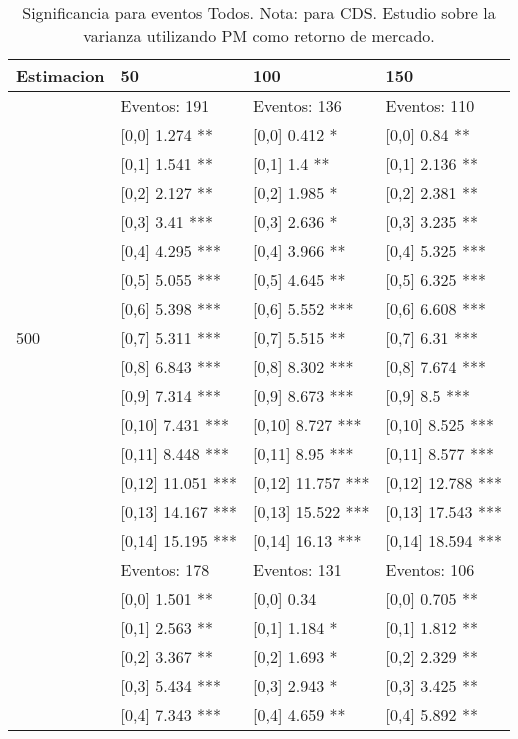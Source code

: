 \begin{table}

\caption{Significancia para eventos Todos. Nota: para CDS. Estudio sobre la varianza utilizando PM como retorno de mercado.}
\centering
\begin{tabular}[t]{llll}
\toprule
Estimacion & 50 & 100 & 150\\
\midrule
 & Eventos:  191 & Eventos:  136 & Eventos:  110\\
 & {}[0,0] 1.274 ** & {}[0,0] 0.412 * & {}[0,0] 0.84 **\\
 & {}[0,1] 1.541 ** & {}[0,1] 1.4 ** & {}[0,1] 2.136 **\\
 & {}[0,2] 2.127 ** & {}[0,2] 1.985 * & {}[0,2] 2.381 **\\
 & {}[0,3] 3.41 *** & {}[0,3] 2.636 * & {}[0,3] 3.235 **\\
\addlinespace
 & {}[0,4] 4.295 *** & {}[0,4] 3.966 ** & {}[0,4] 5.325 ***\\
 & {}[0,5] 5.055 *** & {}[0,5] 4.645 ** & {}[0,5] 6.325 ***\\
 & {}[0,6] 5.398 *** & {}[0,6] 5.552 *** & {}[0,6] 6.608 ***\\
500 & {}[0,7] 5.311 *** & {}[0,7] 5.515 ** & {}[0,7] 6.31 ***\\
 & {}[0,8] 6.843 *** & {}[0,8] 8.302 *** & {}[0,8] 7.674 ***\\
\addlinespace
 & {}[0,9] 7.314 *** & {}[0,9] 8.673 *** & {}[0,9] 8.5 ***\\
 & {}[0,10] 7.431 *** & {}[0,10] 8.727 *** & {}[0,10] 8.525 ***\\
 & {}[0,11] 8.448 *** & {}[0,11] 8.95 *** & {}[0,11] 8.577 ***\\
 & {}[0,12] 11.051 *** & {}[0,12] 11.757 *** & {}[0,12] 12.788 ***\\
 & {}[0,13] 14.167 *** & {}[0,13] 15.522 *** & {}[0,13] 17.543 ***\\
\addlinespace
 & {}[0,14] 15.195 *** & {}[0,14] 16.13 *** & {}[0,14] 18.594 ***\\
 & Eventos:  178 & Eventos:  131 & Eventos:  106\\
 & {}[0,0] 1.501 ** & {}[0,0] 0.34 & {}[0,0] 0.705 **\\
 & {}[0,1] 2.563 ** & {}[0,1] 1.184 * & {}[0,1] 1.812 **\\
 & {}[0,2] 3.367 ** & {}[0,2] 1.693 * & {}[0,2] 2.329 **\\
\addlinespace
 & {}[0,3] 5.434 *** & {}[0,3] 2.943 * & {}[0,3] 3.425 **\\
 & {}[0,4] 7.343 *** & {}[0,4] 4.659 ** & {}[0,4] 5.892 **\\

\end{tabular}
\end{table}
